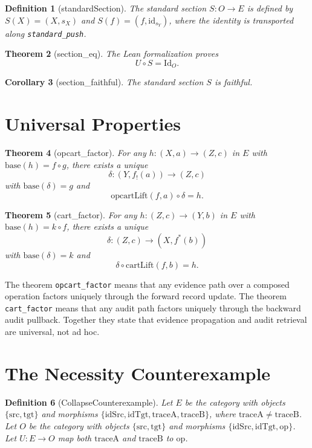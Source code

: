 \documentclass{article}
\newtheorem{theorem}{Theorem}
\newtheorem{definition}[theorem]{Definition}
\newtheorem{corollary}[theorem]{Corollary}
\begin{document}
\begin{definition}[standardSection]
The standard section $S : O \to E$ is defined by $S(X)=(X,s_X)$ and $S(f)=(f,\mathrm{id}_{s_Y})$, where the identity is transported along \texttt{standard\_push}.
\end{definition}

\begin{theorem}[section\_eq]
The Lean formalization proves
\[
  U \circ S = \mathrm{Id}_O.
\]
\end{theorem}

\begin{corollary}[section\_faithful]
The standard section $S$ is faithful.
\end{corollary}

\section{Universal Properties}

\begin{theorem}[opcart\_factor]
For any $h : (X,a) \to (Z,c)$ in $E$ with $\mathrm{base}(h)=f \circ g$, there exists a unique
\[
  \delta : (Y,f_!(a)) \to (Z,c)
\]
with $\mathrm{base}(\delta)=g$ and
\[
  \mathrm{opcartLift}(f,a) \circ \delta = h.
\]
\end{theorem}

\begin{theorem}[cart\_factor]
For any $h : (Z,c) \to (Y,b)$ in $E$ with $\mathrm{base}(h)=k \circ f$, there exists a unique
\[
  \delta : (Z,c) \to (X,f^*(b))
\]
with $\mathrm{base}(\delta)=k$ and
\[
  \delta \circ \mathrm{cartLift}(f,b) = h.
\]
\end{theorem}

The theorem \texttt{opcart\_factor} means that any evidence path over a composed operation factors uniquely through the forward record update. The theorem \texttt{cart\_factor} means that any audit path factors uniquely through the backward audit pullback. Together they state that evidence propagation and audit retrieval are universal, not ad hoc.

\section{The Necessity Counterexample}

\begin{definition}[CollapseCounterexample]
Let $E$ be the category with objects $\{\mathrm{src},\mathrm{tgt}\}$ and morphisms $\{\mathrm{idSrc},\mathrm{idTgt},\mathrm{traceA},\mathrm{traceB}\}$, where $\mathrm{traceA}\neq\mathrm{traceB}$. Let $O$ be the category with objects $\{\mathrm{src},\mathrm{tgt}\}$ and morphisms $\{\mathrm{idSrc},\mathrm{idTgt},\mathrm{op}\}$. Let $U : E \to O$ map both $\mathrm{traceA}$ and $\mathrm{traceB}$ to $\mathrm{op}$.
\end{definition}
\end{document}
